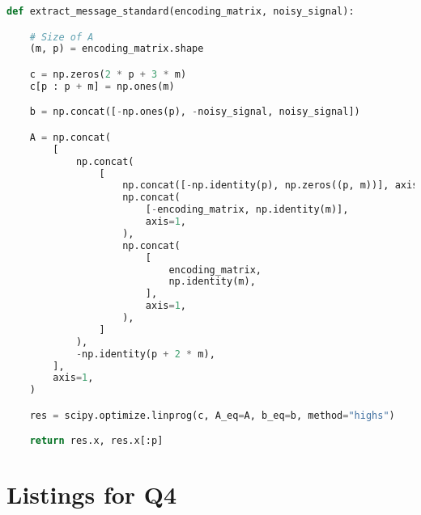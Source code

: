 \documentclass{article}
\begin{document}
\begin{lstlisting}[language=Python, caption={Message decryption based on solution of LOP in standard form. The output is tuple of solution of the problem, and decrypted message itself}, label={lst:std}]
  def extract_message_standard(encoding_matrix, noisy_signal):

    # Size of A
    (m, p) = encoding_matrix.shape

    c = np.zeros(2 * p + 3 * m)
    c[p : p + m] = np.ones(m)

    b = np.concat([-np.ones(p), -noisy_signal, noisy_signal])

    A = np.concat(
        [
            np.concat(
                [
                    np.concat([-np.identity(p), np.zeros((p, m))], axis=1),
                    np.concat(
                        [-encoding_matrix, np.identity(m)],
                        axis=1,
                    ),
                    np.concat(
                        [
                            encoding_matrix,
                            np.identity(m),
                        ],
                        axis=1,
                    ),
                ]
            ),
            -np.identity(p + 2 * m),
        ],
        axis=1,
    )

    res = scipy.optimize.linprog(c, A_eq=A, b_eq=b, method="highs")

    return res.x, res.x[:p]
\end{lstlisting}




\section{Listings for Q4}
\end{document}
